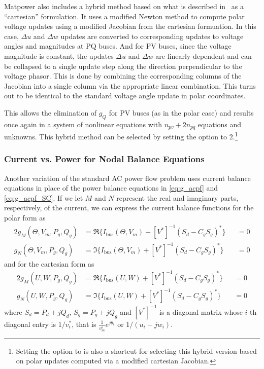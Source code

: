 \documentclass[12pt]{article}
\newcommand{\matpower}[0]{{\sc Matpower}}
\newcommand{\code}[1]{{\relsize{-0.5}{\tt{{#1}}}}}  %
\newcommand{\codeq}[1]{\code{\textquotesingle{}#1\textquotesingle}}  %
\numberwithin{equation}{section}
\numberwithin{table}{section}
\numberwithin{figure}{section}
\begin{document}
\matpower{} also includes a hybrid method based on what is described in~\cite{sereeter2019} as a ``cartesian'' formulation. It uses a modified Newton method to compute polar voltage updates using a modified Jacobian from the cartesian formuation. In this case, $\Delta u$ and $\Delta w$ updates are converted to corresponding updates to voltage angles and magnitudes at PQ buses. And for PV buses, since the voltage magnitude is constant, the updates $\Delta u$ and $\Delta w$ are linearly dependent and can be collapsed to a single update step along the direction perpendicular to the voltage phasor. This is done by combining the corresponding columns of the Jacobian into a single column via the appropriate linear combination. This turns out to be identical to the standard voltage angle update in polar coordinates.

This allows the elimination of $g_Q$ for PV buses (as in the polar case) and results once again in a system of nonlinear equations with $n_{pv} + 2n_{pq}$ equations and unknowns. This hybrid method can be selected by setting the \code{pf.v\_cartesian} option to 2.\footnote{Setting the \code{pf.alg} option to \codeq{NR-SH} is also a shortcut for selecting this hybrid version based on polar updates computed via a modified cartesian Jacobian.}

\subsubsection{Current vs. Power for Nodal Balance Equations}

Another variation of the standard AC power flow problem uses current balance equations in place of the power balance equations in \eqref{eq:g_acpf} and \eqref{eq:g_acpf_SC}. If we let $M$ and $N$ represent the real and imaginary parts, respectively, of the current, we can express the current balance functions for the polar form as
\begin{alignat}{2}
g_M(\Theta, V_m, P_g, Q_g) &= \Re\{I_\mathrm{bus}(\Theta, V_m) + [V^*]^{-1}(S_d - C_g S_g)^*\} &&= 0 \label{eq:polar_curbal_m_pf} \\
g_N(\Theta, V_m, P_g, Q_g) &= \Im\{I_\mathrm{bus}(\Theta, V_m) + [V^*]^{-1}(S_d - C_g S_g)^*\} &&= 0 \label{eq:polar_curbal_n_pf}
\end{alignat}
and for the cartesian form as
\begin{alignat}{2}
g_M(U, W, P_g, Q_g) &= \Re\{I_\mathrm{bus}(U, W) + [V^*]^{-1}(S_d - C_g S_g)^*\} &&= 0 \label{eq:cart_curbal_m_pf} \\
g_N(U, W, P_g, Q_g) &= \Im\{I_\mathrm{bus}(U, W) + [V^*]^{-1}(S_d - C_g S_g)^*\} &&= 0 \label{eq:cart_curbal_n_pf}
\end{alignat}
where $S_d = P_d + j Q_d$, $S_g = P_g + j Q_g$ and $[V^*]^{-1}$ is a diagonal matrix whose $i$-th diagonal entry is $1/v_i^*$, that is $\frac{1}{v_m^i}e^{j\theta_i}$ or $1/(u_i - j w_i)$.
\end{document}

